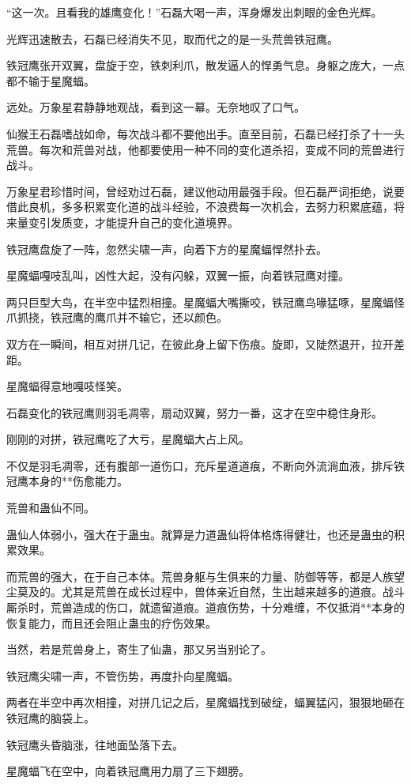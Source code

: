\begin{this_body}
“这一次。且看我的雄鹰变化！”石磊大喝一声，浑身爆发出刺眼的金色光辉。

光辉迅速散去，石磊已经消失不见，取而代之的是一头荒兽铁冠鹰。

铁冠鹰张开双翼，盘旋于空，铁刺利爪，散发逼人的悍勇气息。身躯之庞大，一点都不输于星魔蝠。

远处。万象星君静静地观战，看到这一幕。无奈地叹了口气。

仙猴王石磊嗜战如命，每次战斗都不要他出手。直至目前，石磊已经打杀了十一头荒兽。每次和荒兽对战，他都要使用一种不同的变化道杀招，变成不同的荒兽进行战斗。

万象星君珍惜时间，曾经劝过石磊，建议他动用最强手段。但石磊严词拒绝，说要借此良机，多多积累变化道的战斗经验，不浪费每一次机会，去努力积累底蕴，将来量变引发质变，才能提升自己的变化道境界。

铁冠鹰盘旋了一阵，忽然尖啸一声，向着下方的星魔蝠悍然扑去。

星魔蝠嘎吱乱叫，凶性大起，没有闪躲，双翼一振，向着铁冠鹰对撞。

两只巨型大鸟，在半空中猛烈相撞。星魔蝠大嘴撕咬，铁冠鹰鸟喙猛啄，星魔蝠怪爪抓挠，铁冠鹰的鹰爪并不输它，还以颜色。

双方在一瞬间，相互对拼几记，在彼此身上留下伤痕。旋即，又陡然退开，拉开差距。

星魔蝠得意地嘎吱怪笑。

石磊变化的铁冠鹰则羽毛凋零，扇动双翼，努力一番，这才在空中稳住身形。

刚刚的对拼，铁冠鹰吃了大亏，星魔蝠大占上风。

不仅是羽毛凋零，还有腹部一道伤口，充斥星道道痕，不断向外流淌血液，排斥铁冠鹰本身的**伤愈能力。

荒兽和蛊仙不同。

蛊仙人体弱小，强大在于蛊虫。就算是力道蛊仙将体格炼得健壮，也还是蛊虫的积累效果。

而荒兽的强大，在于自己本体。荒兽身躯与生俱来的力量、防御等等，都是人族望尘莫及的。尤其是荒兽在成长过程中，兽体亲近自然，生出越来越多的道痕。战斗厮杀时，荒兽造成的伤口，就遗留道痕。道痕伤势，十分难缠，不仅抵消**本身的恢复能力，而且还会阻止蛊虫的疗伤效果。

当然，若是荒兽身上，寄生了仙蛊，那又另当别论了。

铁冠鹰尖啸一声，不管伤势，再度扑向星魔蝠。

两者在半空中再次相撞，对拼几记之后，星魔蝠找到破绽，蝠翼猛闪，狠狠地砸在铁冠鹰的脑袋上。

铁冠鹰头昏脑涨，往地面坠落下去。

星魔蝠飞在空中，向着铁冠鹰用力扇了三下翅膀。


\end{this_body}
